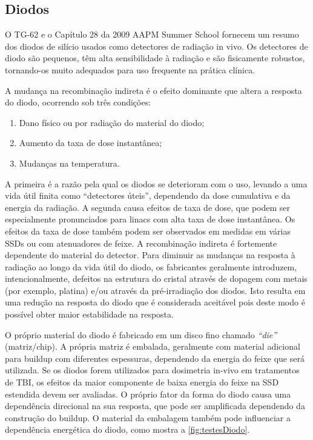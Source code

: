 \documentclass[11pt,a4paper]{article}
\newcounter{exemplo}
\begin{document}
\subsection{Diodos}

	O TG-62 e o Capítulo 28 da 2009 AAPM Summer School fornecem um resumo dos diodos de silício usados como detectores de radiação in vivo. Os detectores de diodo são pequenos, têm alta sensibilidade à radiação e são fisicamente robustos, tornando-os muito adequados para uso frequente na prática clínica.

	A mudança na recombinação indireta é o efeito dominante que altera a resposta do diodo, ocorrendo sob três condições:

	\begin{enumerate}[label=\textcolor{CarnationPink}{\arabic*${}^\circ $}]
		\item Dano físico ou por radiação do material do diodo;
		\item Aumento da taxa de dose instantânea;
		\item Mudanças na temperatura.
	\end{enumerate}

	A primeira é a razão pela qual os diodos se deterioram com o uso, levando a uma vida útil finita como ``detectores úteis'', dependendo da dose cumulativa e da energia da radiação. A segunda causa efeitos de taxa de dose, que podem ser especialmente pronunciados para linacs com alta taxa de dose instantânea. Os efeitos da taxa de dose também podem ser observados em medidas em várias SSDs ou com atenuadores de feixe. A recombinação indireta é fortemente dependente do material do detector. Para diminuir as mudanças na resposta à radiação ao longo da vida útil do diodo, os fabricantes geralmente introduzem, intencionalmente, defeitos na estrutura do cristal através de dopagem com metais (por exemplo, platina) e/ou através da pré-irradiação dos diodos. Isto resulta em uma redução na resposta do diodo que é considerada aceitável pois deste modo é possível obter maior estabilidade na resposta.

	O próprio material do diodo é fabricado em um disco fino chamado \textit{``die''} (matriz/chip). A própria matriz é embalada, geralmente com material adicional para buildup com diferentes espessuras, dependendo da energia do feixe que será utilizada. Se os diodos forem utilizados para dosimetria in-vivo em tratamentos de TBI, os efeitos da maior componente de baixa energia do feixe na SSD estendida devem ser avaliadas. O próprio fator da forma do diodo causa uma dependência direcional na sua resposta, que pode ser amplificada dependendo da construção do buildup. O material da embalagem também pode influenciar a dependência energética do diodo, como mostra a \ref{fig:testesDiodo}.
\end{document}
